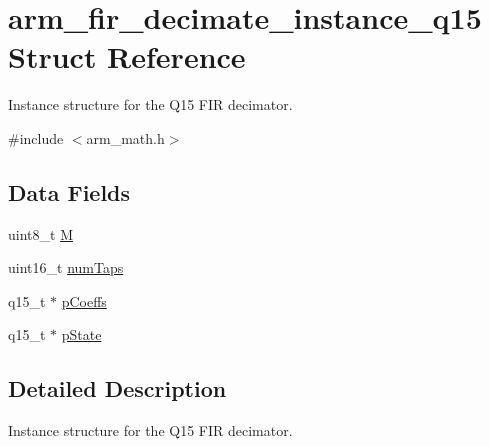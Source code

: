 \hypertarget{structarm__fir__decimate__instance__q15}{\section{arm\-\_\-fir\-\_\-decimate\-\_\-instance\-\_\-q15 Struct Reference}
\label{structarm__fir__decimate__instance__q15}
}


Instance structure for the Q15 F\-I\-R decimator.  




{\ttfamily \#include $<$arm\-\_\-math.\-h$>$}

\subsection*{Data Fields}
\begin{DoxyCompactItemize}
\item 
uint8\-\_\-t \hyperlink{structarm__fir__decimate__instance__q15_ae2c8107d00d3c9942e7a20fc598edecf}{M}
\item 
uint16\-\_\-t \hyperlink{structarm__fir__decimate__instance__q15_a751941891e47f522a7f5375fe8990aac}{num\-Taps}
\item 
q15\-\_\-t $\ast$ \hyperlink{structarm__fir__decimate__instance__q15_a7ca181a37f714d174445f486bebce26f}{p\-Coeffs}
\item 
q15\-\_\-t $\ast$ \hyperlink{structarm__fir__decimate__instance__q15_ae29dfdb736374fcddaeaec4b7770170c}{p\-State}
\end{DoxyCompactItemize}


\subsection{Detailed Description}
Instance structure for the Q15 F\-I\-R decimator. 

